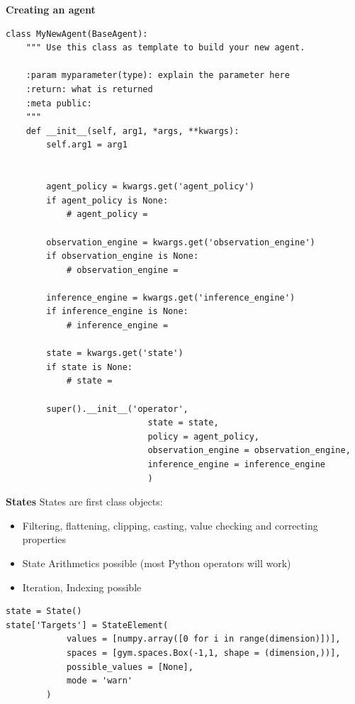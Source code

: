 \documentclass[11pt, xcolor = {dvipsnames}]{beamer}
\begin{document}
\begin{frame}[fragile]{\textbf{Creating an agent}}
\begin{adjustbox}{height=.4\textheight}\lstset{language=Python}
\lstset{frame=lines}
\lstset{basicstyle=\footnotesize}
\begin{lstlisting}
class MyNewAgent(BaseAgent):
    """ Use this class as template to build your new agent.

    :param myparameter(type): explain the parameter here
    :return: what is returned
    :meta public:
    """
    def __init__(self, arg1, *args, **kwargs):
        self.arg1 = arg1


        agent_policy = kwargs.get('agent_policy')
        if agent_policy is None:
            # agent_policy =

        observation_engine = kwargs.get('observation_engine')
        if observation_engine is None:
            # observation_engine =

        inference_engine = kwargs.get('inference_engine')
        if inference_engine is None:
            # inference_engine =

        state = kwargs.get('state')
        if state is None:
            # state =

        super().__init__('operator',
                            state = state,
                            policy = agent_policy,
                            observation_engine = observation_engine,
                            inference_engine = inference_engine
                            )

\end{lstlisting}
\end{adjustbox}
\end{frame}


\begin{frame}[fragile]{\textbf{States}}
States are first class objects:
\begin{itemize}
\item Filtering, flattening, clipping, casting, value checking and correcting properties
\item State Arithmetics possible (most Python operators will work)
\item Iteration, Indexing possible
\end{itemize}

\begin{adjustbox}{width=.8\textwidth}
\lstset{language=Python}
\lstset{frame=lines}
\lstset{basicstyle=\footnotesize}
\begin{lstlisting}
state = State()
state['Targets'] = StateElement(
            values = [numpy.array([0 for i in range(dimension)])],
            spaces = [gym.spaces.Box(-1,1, shape = (dimension,))],
            possible_values = [None],
            mode = 'warn'
        )
\end{lstlisting}
\end{adjustbox}

\end{frame}
\end{document}

